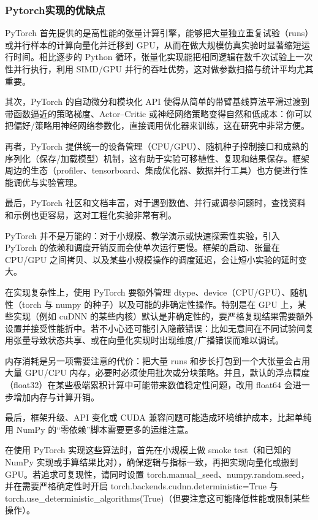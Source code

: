 \documentclass[11pt]{ctexart}
\begin{document}
\hypertarget{pytorchux5b9eux73b0ux7684ux4f18ux7f3aux70b9}{%
\subsubsection{Pytorch实现的优缺点}\label{pytorchux5b9eux73b0ux7684ux4f18ux7f3aux70b9}}

PyTorch
首先提供的是高性能的张量计算引擎，能够把大量独立重复试验（runs）或并行样本的计算向量化并迁移到
GPU，从而在做大规模仿真实验时显著缩短运行时间。相比逐步的 Python
循环，张量化实现能把相同逻辑在数千次试验上一次性并行执行，利用 SIMD/GPU
并行的吞吐优势，这对做参数扫描与统计平均尤其重要。

其次，PyTorch 的自动微分和模块化 API
使得从简单的带臂基线算法平滑过渡到带函数逼近的策略梯度、Actor--Critic
或神经网络策略变得自然和低成本：你可以把偏好/策略用神经网络参数化，直接调用优化器来训练，这在研究中非常方便。

再者，PyTorch
提供统一的设备管理（CPU/GPU）、随机种子控制接口和成熟的序列化（保存/加载模型）机制，这有助于实验可移植性、复现和结果保存。框架周边的生态（profiler、tensorboard、集成优化器、数据并行工具）也方便进行性能调优与实验管理。

最后，PyTorch
社区和文档丰富，对于遇到数值、并行或调参问题时，查找资料和示例也更容易，这对工程化实验非常有利。

PyTorch 并不是万能的：对于小规模、教学演示或快速探索性实验，引入 PyTorch
的依赖和调度开销反而会使单次运行更慢。框架的启动、张量在 CPU/GPU
之间拷贝、以及某些小规模操作的调度延迟，会让短小实验的延时变大。

在实现复杂性上，使用 PyTorch 要额外管理
dtype、device（CPU/GPU）、随机性（torch 与 numpy
的种子）以及可能的非确定性操作。特别是在 GPU 上，某些实现（例如 cuDNN
的某些内核）默认是非确定性的，要严格复现结果需要额外设置并接受性能折中。若不小心还可能引入隐蔽错误：比如无意间在不同试验间复用张量导致状态共享、或在向量化实现时出现维度/广播错误而难以调试。

内存消耗是另一项需要注意的代价：把大量 runs
和步长打包到一个大张量会占用大量 GPU/CPU
内存，必要时必须使用批次或分块策略。并且，默认的浮点精度（float32）在某些极端累积计算中可能带来数值稳定性问题，改用
float64 会进一步增加内存与计算开销。

最后，框架升级、API 变化或 CUDA 兼容问题可能造成环境维护成本，比起单纯用
NumPy 的``零依赖''脚本需要更多的运维注意。

在使用 PyTorch 实现这些算法时，首先在小规模上做 smoke test（和已知的
NumPy 实现或手算结果比对），确保逻辑与指标一致，再把实现向量化或搬到
GPU。若追求可复现性，请同时设置
torch.manual\_seed、numpy.random.seed，并在需要严格确定性时开启
torch.backends.cudnn.deterministic=True 与
torch.use\_deterministic\_algorithms(True)（但要注意这可能降低性能或限制某些操作）。
\end{document}
